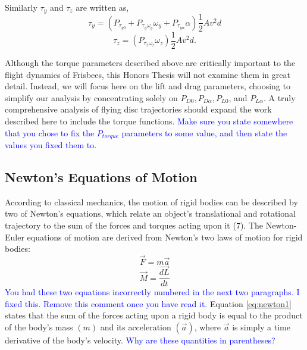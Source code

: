 \documentclass[a4paper,12pt, oneside]{article}
\newcommand{\blue}[1]{\textcolor{blue}{#1}}
\begin{document}
Similarly $\tau_y$ and $\tau_z$ are written as,
\begin{equation}
  \tau_y=(P_{\tau_{y0}}+P_{\tau_y\omega_y}\omega_y+P_{\tau_{y\alpha}}\alpha)\frac{1}2Av^2d
\end{equation}
\begin{equation}
  \tau_z=(P_{\tau_z\omega_z}\omega_z)\frac{1}2Av^2d.
\end{equation}

Although the torque parameters described above are critically important to the flight dynamics of Frisbees, this Honors Thesis will not examine them in great detail. Instead, we will focus here on the lift and drag parameters, choosing to simplify our analysis by concentrating solely on $P_{D0}, P_{D\alpha}, P_{L0}$, and $P_{L\alpha}$. A truly comprehensive analysis of flying disc trajectories should expand the work described here to include the torque functions.
\blue{Make sure you state somewhere that you chose to fix the $P_{torque}$ parameters to some value, and then state the values you fixed them to.}

\subsection{Newton's Equations of Motion} 

According to classical mechanics, the motion of rigid bodies can be described by two of Newton's equations, which relate an object's translational and rotational trajectory to the sum of the forces and torques acting upon it (7).  The Newton-Euler equations of motion are derived from Newton's two laws of motion for rigid bodies:
\begin{equation}
  \label{eq:newton1}
  \vec{F}=\textit{m}\vec{a}
\end{equation}
\begin{equation}
  \label{eq:newton2}
  \vec{M}=\dfrac{\vec{dL}}{dt}
\end{equation}
\blue{You had these two equations incorrectly numbered in the next two paragraphs. I fixed this. Remove this comment once you have read it.}
Equation \ref{eq:newton1} states that the sum of the forces acting upon a rigid body is equal to the product of the body's mass $(\textit{m})$ and its acceleration $(\vec{a})$, where $\vec{a}$ is simply a time derivative of the body's velocity.  \blue{Why are these quantities in parentheses?}
\end{document}
